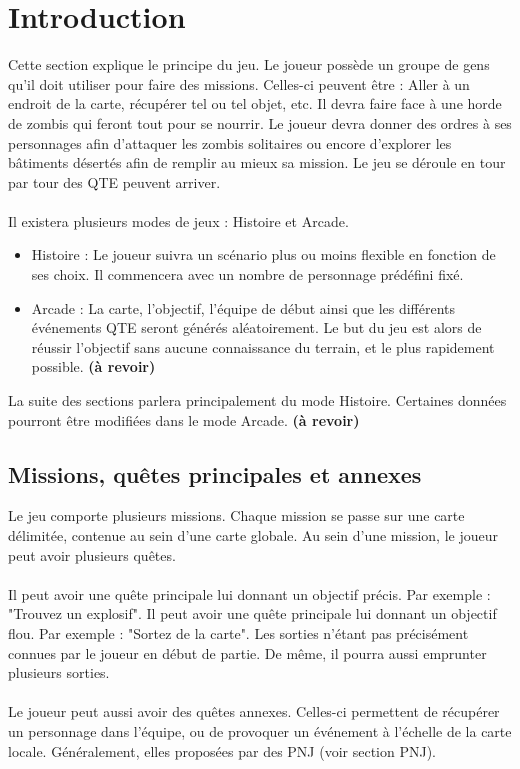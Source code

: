 \section{Introduction}
Cette section explique le principe du jeu. 
Le joueur possède un groupe de gens qu'il doit utiliser pour faire des missions. Celles-ci peuvent être : Aller à un endroit de la carte, récupérer tel ou tel objet, etc. Il devra faire face à une horde de zombis qui feront tout pour se nourrir. Le joueur devra donner des ordres à ses personnages afin d'attaquer les zombis solitaires ou encore d'explorer les bâtiments désertés afin de remplir au mieux sa mission. Le jeu se déroule en tour par tour des QTE peuvent arriver.
\\\\
Il existera plusieurs modes de jeux : Histoire et Arcade.
\begin{itemize}
  \item Histoire : Le joueur suivra un scénario plus ou moins flexible en fonction de ses choix. Il commencera avec un nombre de personnage prédéfini fixé.
  \item Arcade : La carte, l'objectif, l'équipe de début ainsi que les différents événements QTE seront générés aléatoirement. Le but du jeu est alors de réussir l'objectif sans aucune connaissance du terrain, et le plus rapidement possible. \textbf{(à revoir)}
\end{itemize}
La suite des sections parlera principalement du mode Histoire. Certaines données pourront être modifiées dans le mode Arcade. \textbf{(à revoir)}
\subsection{Missions, quêtes principales et annexes}
Le jeu comporte plusieurs missions. Chaque mission se passe sur une carte délimitée, contenue au sein d'une carte globale. Au sein d'une mission, le joueur peut avoir plusieurs quêtes. 
\\\\
Il peut avoir une quête principale lui donnant un objectif précis. Par exemple : "Trouvez un explosif". Il peut avoir une quête principale lui donnant un objectif flou. Par exemple : "Sortez de la carte". Les sorties n'étant pas précisément connues par le joueur en début de partie. De même, il pourra aussi emprunter plusieurs sorties.
\\\\
Le joueur peut aussi avoir des quêtes annexes. Celles-ci permettent de récupérer un personnage dans l'équipe, ou de provoquer un événement à l'échelle de la carte locale. Généralement, elles proposées par des PNJ (voir section PNJ).
